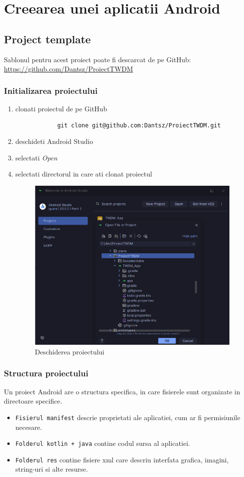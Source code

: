 \section{Creearea unei aplicatii Android}
\subsection{Project template}
Sablonul pentru acest proiect poate fi descarcat de pe GitHub: \url{https://github.com/Dantsz/ProiectTWDM}
\subsubsection{Initializarea proiectului}
\begin{enumerate}
    \item clonati proiectul de pe GitHub
          \begin{lstlisting}
            git clone git@github.com:Dantsz/ProiectTWDM.git
        \end{lstlisting}
    \item deschideti Android Studio
    \item selectati \textit{Open}
    \item selectati directorul in care ati clonat proiectul
          \begin{figure}[H]
              \centering
              \includegraphics[width=0.7\linewidth]{figs/open_project.png}
              \caption{Deschiderea proiectului}
              \label{fig:open_project}
          \end{figure}
\end{enumerate}
\subsubsection{Structura proiectului}
Un proiect Android are o structura specifica, in care fisierele sunt organizate in directoare specifice.
\begin{itemize}
    \item \texttt{Fisierul manifest} descrie proprietati ale aplicatiei, cum ar fi permisiunile necesare.
    \item \texttt{Folderul kotlin + java} contine codul sursa al aplicatiei.
    \item \texttt{Folderul res} contine fisiere xml care descriu interfata grafica, imagini, string-uri si alte resurse.
\end{itemize}
